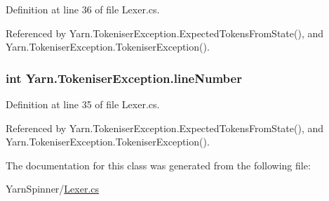 Definition at line 36 of file Lexer.\-cs.



Referenced by Yarn.\-Tokeniser\-Exception.\-Expected\-Tokens\-From\-State(), and Yarn.\-Tokeniser\-Exception.\-Tokeniser\-Exception().

\hypertarget{a00168_a54b936d7b4f26f88a07a66c5fc1d1ad1}{
\subsubsection[{line\-Number}]{\setlength{\rightskip}{0pt plus 5cm}int Yarn.\-Tokeniser\-Exception.\-line\-Number}}\label{a00168_a54b936d7b4f26f88a07a66c5fc1d1ad1}


Definition at line 35 of file Lexer.\-cs.



Referenced by Yarn.\-Tokeniser\-Exception.\-Expected\-Tokens\-From\-State(), and Yarn.\-Tokeniser\-Exception.\-Tokeniser\-Exception().



The documentation for this class was generated from the following file\-:\begin{DoxyCompactItemize}
\item 
Yarn\-Spinner/\hyperlink{a00298}{Lexer.\-cs}\end{DoxyCompactItemize}
